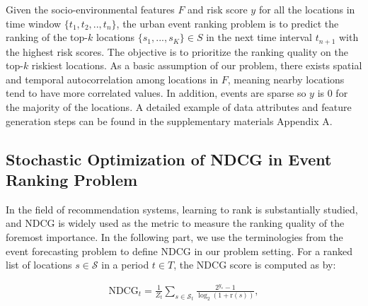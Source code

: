 \documentclass{article}
\def \S {\mathbf{S}}
\def \S {\mathcal{S}}
\begin{document}
Given the socio-environmental features $F$ and risk score $y$ for all the locations in time window $\{t_1,t_2,.., t_n\}$, the urban event ranking problem is to predict the ranking of the top-$k$ locations $\{s_{1},...,s_{K}\} \in S$ in the next time interval $t_{n+1}$ with the highest risk scores. %
The objective is to prioritize the ranking quality on the top-$k$ riskiest locations. As a basic assumption of our problem, there exists spatial and temporal autocorrelation among locations in $F$, meaning nearby locations tend to have more correlated values. In addition, events are sparse so $y$ is 0 for the majority of the locations. %
A detailed example of data attributes and feature generation steps can be found in the supplementary materials Appendix A. 

\subsection{Stochastic Optimization of NDCG in Event Ranking Problem}
In the field of recommendation systems, learning to rank is substantially studied, and NDCG is widely used as the metric to measure the ranking quality of the foremost importance. In the following part, we use the terminologies from the event forecasting problem to define NDCG in our problem setting. For a ranked list of locations $s \in \S$ in a period $t \in T$, the NDCG score is computed as by:

\begin{align}\label{eqn:ori_ndcg}
    \text{NDCG}_t = \frac{1}{Z_t}\sum_{s\in \S_t}\frac{2^{y_s}-1}{\log_2(1+\text{r}(s))},
\end{align}
\end{document}
